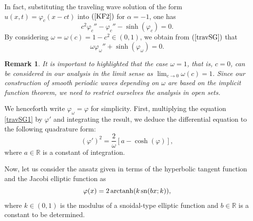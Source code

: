 \documentclass[12pt,reqno,a4paper]{amsart} %
\newcommand{\sn}{{\rm \,sn}}
\numberwithin{equation}{section}
\numberwithin{figure}{section}
\newtheorem{remark}[theorem]{Remark}
\begin{document}
In fact, substituting the traveling wave solution of the form $u(x,t)=\varphi_c(x-ct)$ into $(\ref{KF2})$ for $\alpha=-1$, one has
 \begin{equation}
 	c^2\varphi_c''-\varphi_c''-\sinh(\varphi_c)=0.
 	\label{travSG}\end{equation} By considering $\omega=\omega(c)=1-c^2\in (0,1)$, we obtain from $(\ref{travSG})$ that  
 	\begin{equation}\label{travSG1}
 	\omega \varphi_\omega''+\sinh(\varphi_\omega)=0.
 \end{equation}
 \begin{remark}\label{comega} It is important to highlighted that the case $\omega=1$, that is, $c=0$, can be considered in our analysis in the limit sense as $\displaystyle\lim_{c\rightarrow 0}\omega(c)=1$. Since our construction of smooth periodic waves depending on $\omega$ are based on the implicit function theorem, we need to restrict ourselves the analysis in open sets.
 \end{remark}
  We henceforth write $\varphi_\omega=\varphi$ for simplicity. First, multiplying the equation \eqref{travSG1} by $\varphi'$ and integrating the result, we deduce the differential equation to the following quadrature form:
 \begin{equation}\label{travSG2}
 	( \varphi')^2= \frac{2}{\omega}[a-\cosh(\varphi)], 
 \end{equation}
 where $a\in \mathbb{R}$ is a constant of integration. 
 
 Now, let us consider the ansatz given in terms of the hyperbolic tangent function and the Jacobi elliptic function as
 \begin{equation}\label{ansatz}
 	\varphi(x)  =2\operatorname{arctanh}(k \sn (bx ;k ) ),
 \end{equation}
 where $k\in (0,1)$ is the modulus of a snoidal-type elliptic function and $b\in\mathbb{R}$ is a constant to be determined. 
 
\end{document}
